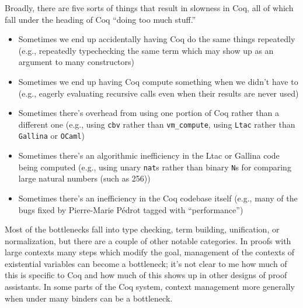 \documentclass{article}
\begin{document}
Broadly, there are five sorts of things that result in slowness in Coq, all of which fall under the heading of Coq ``doing too much stuff.''
\begin{itemize}
\item
  Sometimes we end up accidentally having Coq do the same things repeatedly (e.g., repeatedly typechecking the same term which may show up as an argument to many constructors)
\item
  Sometimes we end up having Coq compute something when we didn't have to (e.g., eagerly evaluating recursive calls even when their results are never used)
\item
  Sometimes there's overhead from using one portion of Coq rather than a different one (e.g., using \texttt{cbv} rather than \texttt{vm\_compute}, using \texttt{Ltac} rather than \texttt{Gallina} or \texttt{OCaml})
\item
  Sometimes there's an algorithmic inefficiency in the Ltac or Gallina code being computed (e.g., using unary \texttt{nat}s rather than binary \texttt{N}s for comparing large natural numbers (such as 256))
\item
  Sometimes there's an inefficiency in the Coq codebase itself (e.g., many of the bugs fixed by Pierre-Marie Pédrot tagged with ``performance'')
\end{itemize}

Most of the bottlenecks fall into type checking, term building, unification, or normalization, but there are a couple of other notable categories.
In proofs with large contexts many steps which modify the goal, management of the contexts of existential variables can become a bottleneck; it's not clear to me how much of this is specific to Coq and how much of this shows up in other designs of proof assistants.
In some parts of the Coq system, context management more generally when under many binders can be a bottleneck.
\end{document}
